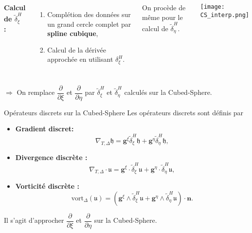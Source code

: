 \documentclass[11pt]{beamer}
\def\dxi{\tilde{\delta}^H_{\xi}}
\def\deta{\tilde{\delta}^H_{\eta}}
\begin{document}
\begin{frame}
\begin{columns}
\textbf{Calcul de $\dxi$ :}
\begin{enumerate}
\item Complétion des données sur un grand cercle complet par \textbf{spline cubique},
\item Calcul de la dérivée approchée en utilisant $\delta_{\xi}^H$.
\end{enumerate}
On procède de même pour le calcul de $\deta$.

\begin{center}
\texttt{[image: CS\_interp.png]}
\end{center}
\end{columns}

$\Rightarrow$ On remplace $\dfrac{\partial}{\partial \xi}$ et $\dfrac{\partial}{\partial \eta}$ par $\dxi$ et $\deta$ calculés sur la Cubed-Sphere.
\end{frame}


















\begin{frame}{Opérateurs discrets sur la Cubed-Sphere}
Les opérateurs discrets sont définis par
\begin{block}{}
\begin{itemize}
\item \textbf{Gradient discret:}
$$
\nabla_{T,\Delta} \mathfrak{h} = \mathbf{g}^{\xi} \dxi \mathfrak{h} + \mathbf{g}^{\eta} \deta \mathfrak{h},
$$
\item \textbf{Divergence discrète :}
$$
\nabla_{T,\Delta} \cdot \mathfrak{u} = \mathbf{g}^{\xi} \cdot \dxi \mathfrak{u} + \mathbf{g}^{\eta} \cdot \deta \mathfrak{u},
$$
\item \textbf{Vorticité discrète :}
$$
\text{vort}_{\Delta} (\mathfrak{u}) = \left( \mathbf{g}^{\xi} \wedge \dxi \mathfrak{u} + \mathbf{g}^{\eta} \wedge \deta \mathfrak{u} \right) \cdot \mathbf{n}.
$$
\end{itemize}
\end{block}
Il s'agit d'approcher $\dfrac{\partial}{\partial \xi}$ et $\dfrac{\partial}{\partial \eta}$ sur la Cubed-Sphere.
\end{frame}
\end{document}
